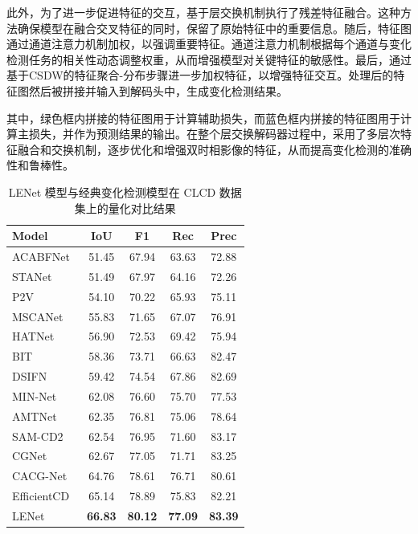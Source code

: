 此外，为了进一步促进特征的交互，基于层交换机制执行了残差特征融合。这种方法确保模型在融合交叉特征的同时，保留了原始特征中的重要信息。随后，特征图通过通道注意力机制加权，以强调重要特征。通道注意力机制根据每个通道与变化检测任务的相关性动态调整权重，从而增强模型对关键特征的敏感性。最后，通过基于CSDW的特征聚合-分布步骤进一步加权特征，以增强特征交互。处理后的特征图然后被拼接并输入到解码头中，生成变化检测结果。

其中，绿色框内拼接的特征图用于计算辅助损失，而蓝色框内拼接的特征图用于计算主损失，并作为预测结果的输出。在整个层交换解码器过程中，采用了多层次特征融合和交换机制，逐步优化和增强双时相影像的特征，从而提高变化检测的准确性和鲁棒性。

\begin{table}[!htbp]
  \centering
  \caption{LENet 模型与经典变化检测模型在 CLCD 数据集上的量化对比结果}
  \label{tab:lenet_clcd}
  \begin{tabular}{lcccc}
    \toprule
    Model                &  IoU   &   F1   &  Rec   &  Prec  \\
    \midrule
    ACABFNet~\cite{Song2023AxialCA}    & 51.45  & 67.94  & 63.63  & 72.88  \\
    STANet~\cite{chen_spatial-temporal_2020}      & 51.49  & 67.97  & 64.16  & 72.26  \\
    P2V~\cite{lin_transition_2023}        & 54.10  & 70.22  & 65.93  & 75.11  \\
    MSCANet~\cite{m_liu_cnn-transformer_2022}     & 55.83  & 71.65  & 67.07  & 76.91  \\
    HATNet~\cite{Xu2024HybridAT}    & 56.90  & 72.53  & 69.42  & 75.94  \\
    BIT~\cite{chen_remote_2022}         & 58.36  & 73.71  & 66.63  & 82.47  \\
    DSIFN~\cite{Zhang2020ADS}       & 59.42  & 74.54  & 67.86  & 82.69  \\
    MIN-Net~\cite{Zhou2024MultistageIN}     & 62.08  & 76.60  & 75.70  & 77.53  \\
    AMTNet~\cite{Liu2023AnAM}      & 62.35  & 76.81  & 75.06  & 78.64  \\
    SAM-CD2~\cite{Sun2024SegmentAM}     & 62.54  & 76.95  & 71.60  & 83.17  \\
    CGNet~\cite{han_change_2023}       & 62.67  & 77.05  & 71.71  & 83.25  \\
    CACG-Net~\cite{Liu2024CandidateAwareAC}    & 64.76  & 78.61  & 76.71  & 80.61  \\
    EfficientCD~\cite{dong_efficientcd_2024}& 65.14  & 78.89  & 75.83  & 82.21  \\
    LENet                & \textbf{66.83} & \textbf{80.12} & \textbf{77.09} & \textbf{83.39} \\
    \bottomrule
  \end{tabular}
\end{table}

